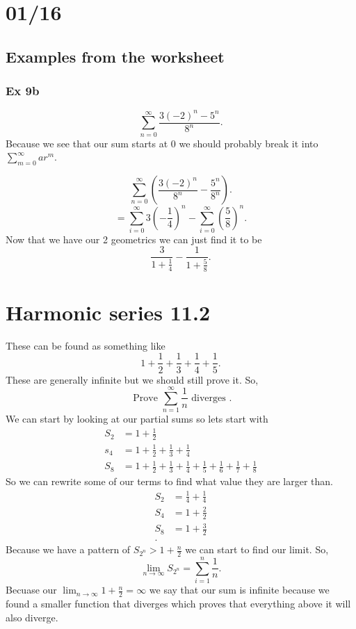 \section{01/16}%
\label{sec:01/16}
\subsection{Examples from the worksheet}%
\label{sub:Examples from the worksheet}

\subsubsection*{Ex 9b}
\[
\sum_{ n=0 } ^{ \infty } \frac{ 3\left( -2 \right) ^{ n }-5^{ n } }{ 8^{ n } }
.\] 
Because we see that our sum starts at 0 we should probably break it into $ \sum_{ m=0 } ^{ \infty } ar^{ m } $.

\[
\sum_{ n=0 } ^{ \infty } \left( \frac{ 3\left( -2 \right) ^{ n } }{ 8^{ n } }-\frac{ 5^{ n } }{ 8^{ n } } \right) 
.\] 
\[
=\sum_{ i=0 } ^{ \infty } 3\left( -\frac{ 1 }{ 4 }  \right) ^{ n }-\sum_{ i=0 } ^{ \infty } \left( \frac{ 5 }{ 8 }  \right) ^{ n } 
.\] 
Now that we have our 2 geometrics we can just find it to be
\[
\frac{ 3 }{ 1+\frac{ 1 }{ 4 }  } -\frac{ 1 }{ 1+\frac{ 5 }{ 8 }  } 
.\] 

\section{Harmonic series 11.2}%
\label{sec:Harmonic series 11.2}

These can be found as something like 
\[
1+\frac{ 1 }{ 2 } +\frac{ 1 }{ 3 } +\frac{ 1 }{ 4 } +\frac{ 1 }{ 5 } 
.\] 
These are generally infinite but we should still prove it. So,
\[
\text{ Prove } \sum_{ n=1 } ^{ \infty } \frac{ 1 }{ n } \text{ diverges }
.\] 
We can start by looking at our partial sums so lets start with
\begin{align*}
	S_2 &= 1+ \frac{ 1 }{ 2 } \\
	s_4 &= 1+ \frac{ 1 }{ 2 } +\frac{ 1 }{ 3 } +\frac{ 1 }{ 4 } \\
	S_8 &= 1+\frac{ 1 }{ 2 } +\frac{ 1 }{ 3 } +\frac{ 1 }{ 4 } +\frac{ 1 }{ 5 } +\frac{ 1 }{ 6 } +\frac{ 1 }{ 7 } +\frac{ 1 }{ 8 } 
\end{align*}
So we can rewrite some of our terms to find what value they are larger than. 
\begin{align*}
S_2 &= \frac{ 1 }{ 4 } +\frac{ 1 }{ 4 }  \\
S_4 &= 1+\frac{ 2 }{ 2 }  \\
S_8 &= 1+\frac{ 3 }{ 2 }  \\
.\end{align*}
Because we have a pattern of $ S_{ 2^{ n } }>1+\frac{ n }{ 2 }  $ we can start to find our limit. So,
\[
\lim_{ n \to \infty} S_{ 2^{ n } }=\sum_{ i=1 } ^{ n } \frac{ 1 }{ n } 
.\] 
Becuase our $ \lim_{ n \to \infty} 1+\frac{ n }{ 2 } = \infty $ we say that our sum is infinite because we found a smaller function that diverges which proves that everything above it will also diverge. 

